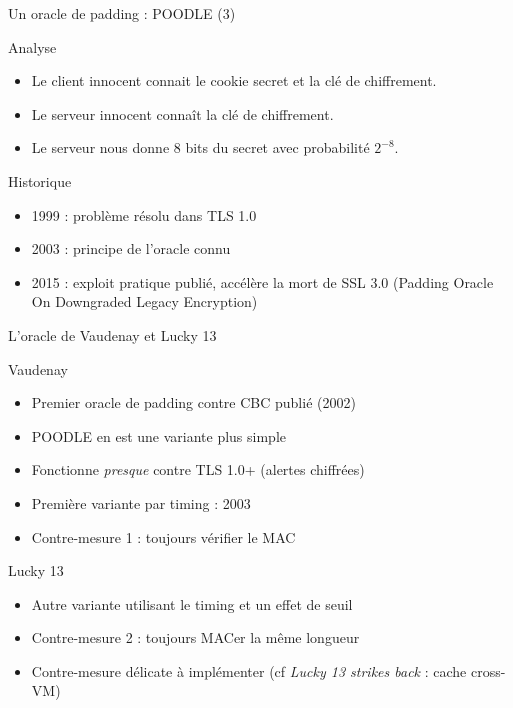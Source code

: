 \documentclass{mpg-ep-slides}
\begin{document}
\begin{frame}{Un oracle de padding : POODLE (3)}
  \begin{block}{Analyse}
    \begin{itemize}
      \item Le client innocent connait le cookie secret et la clé de
        chiffrement.
      \item Le serveur innocent connaît la clé de chiffrement.
      \item Le serveur nous donne 8 bits du secret avec probabilité $2^{-8}$.
    \end{itemize}
  \end{block}

  \begin{block}{Historique}
    \begin{itemize}
      \item 1999 : problème résolu dans TLS 1.0
      \item 2003 : principe de l'oracle connu
      \item 2015 : exploit pratique publié, accélère la mort de SSL 3.0
        (Padding Oracle On Downgraded Legacy Encryption)
    \end{itemize}
  \end{block}
\end{frame}

\begin{frame}{L'oracle de Vaudenay et Lucky 13}
  \begin{block}{Vaudenay}
    \begin{itemize}
      \item Premier oracle de padding contre CBC publié (2002)
      \item POODLE en est une variante plus simple
      \item Fonctionne \emph{presque} contre TLS 1.0+ (alertes chiffrées)
      \item Première variante par timing : 2003
      \item Contre-mesure 1 : toujours vérifier le MAC
    \end{itemize}
  \end{block}

  \begin{block}{Lucky 13}
    \begin{itemize}
      \item Autre variante utilisant le timing et un effet de seuil
      \item Contre-mesure 2 : toujours MACer la même longueur
      \item Contre-mesure délicate à implémenter
        (cf \emph{Lucky 13 strikes back} : cache cross-VM)
    \end{itemize}
  \end{block}
\end{frame}
\end{document}
